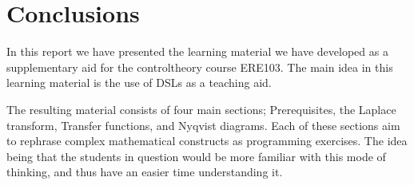 \section{Conclusions}


\iffalse
In this report we have presented the learning material we have developed as a supplementary aid for the \gls{controltheory} course \gls{ERE103}. The methodology that is used in this learning material is the use of domain specific-languages(\gls{DSL}s) and \gls{Haskell} which hopefully will help the students learning the material. 

Due to time constraints the product has not been tested on any students. The targeted course runs in the fall but the project took place in the spring but we have presented a strong foundation in previous research that suggest that this approach is favourable. We propose a future project can be performed that tests the effect it has on students learning. Other projects that use the same theories as we have used should also be useful and can be used to develop similar materials in either other subjects or as a continuation of our project.
\fi



In this report we have presented the learning material we have developed as a supplementary aid for the \gls{controltheory} course \gls{ERE103}. 
The main idea in this learning material is the use of DSLs as a teaching aid. 

The resulting material consists of four main sections; Prerequisites, the Laplace transform, Transfer functions, and Nyqvist diagrams. Each of these sections aim to rephrase complex mathematical constructs as programming exercises. The idea being that the students in question would be more familiar with this mode of thinking, and thus have an easier time understanding it.

